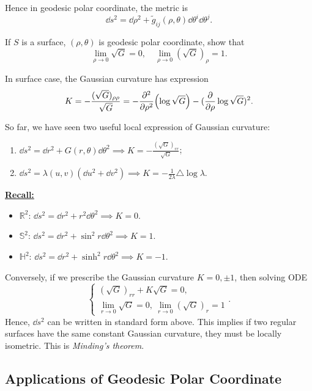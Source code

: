 Hence in geodesic polar coordinate, the metric is \[
    \dd{s}^2=\dd{\rho}^2+\tilde{g}_{ij}(\rho,\theta)\dd{\theta^i}\dd{\theta^j}
.\] 

\begin{exercise}
    If \(S\) is a surface, \((\rho,\theta)\) is geodesic polar coordinate, show that \[
        \lim_{\rho \to 0} \sqrt{G}=0,\quad
        \lim_{\rho \to 0} (\sqrt{G})_\rho=1
    .\] 
\end{exercise}
\begin{remark}
    In surface case, the Gaussian curvature has expression \[
        K=-\frac{(\sqrt{G})_{\rho\rho}}{\sqrt{G}}
        =-\pdv[2]{\rho}(\log \sqrt{G})
        -(\pdv{\rho}\log\sqrt{G})^2
    .\] 
\end{remark}

{\color{red}
So far, we have seen two useful local expression of Gaussian curvature:
\begin{enumerate}[(1)]
\item \(\dd{s}^2=\dd{r}^2+G(r,\theta)\dd{\theta}^2\implies 
    K=-\frac{(\sqrt{G})_{rr}}{\sqrt{G}}\);
\item \(\dd{s}^2=\lambda(u,v)(\dd{u}^2+\dd{v}^2)
    \implies K=-\frac{1}{2\lambda}\triangle \log\lambda\).
\end{enumerate}
}

\noindent\underline{\bfseries Recall:}
\begin{itemize}
\item \(\mathbb{R}^2\): \(\dd{s^2}=\dd{r^2}+r^2\dd{\theta}^2\implies K=0\).
\item \(\mathbb{S}^2\): \(\dd{s^2}=\dd{r^2}+\sin^2 r\dd{\theta}^2\implies K=1\).
\item \(\mathbb{H}^2\): \(\dd{s^2}=\dd{r^2}+\sinh^2 r\dd{\theta}^2\implies K=-1\).
\end{itemize}
Conversely, if we prescribe the Gaussian curvature \(K=0,\pm1\), then solving
ODE \[
    \begin{cases}
        (\sqrt{G})_{rr}+K\sqrt{G}=0, \\
        \lim_{r\to 0}\sqrt{G}=0,\ \lim_{r\to 0}(\sqrt{G})_r=1
    \end{cases}
.\] Hence, \(\dd{s}^2\) can be written in standard form above. This implies if two
regular surfaces have the same constant Gaussian curvature, they must be locally
isometric. This is \emph{Minding's theorem}.

\subsection{Applications of Geodesic Polar Coordinate}

